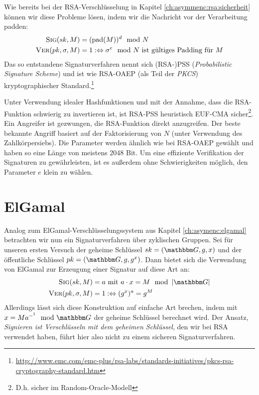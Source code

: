 Wie bereits bei der RSA-Verschlüsselung in Kapitel \ref{ch:asymmenc:rsa:sicherheit} können wir diese Probleme lösen, indem wir die Nachricht vor der Verarbeitung padden:
\begin{align*}
\textsc{Sig}(sk,M) &= (\text{pad}(M))^d \mod N\\
\textsc{Ver}(pk,\sigma,M) &= 1 :\Leftrightarrow \sigma^e \mod N \text{ ist gültiges Padding für } M
\end{align*}
Das so entstandene Signaturverfahren nennt sich (RSA-)PSS (\emph{Probabilistic Signature Scheme}) und ist wie RSA-OAEP (als Teil der \emph{PKCS}) kryptographischer Standard.\footnote{\url{http://www.emc.com/emc-plus/rsa-labs/standards-initiatives/pkcs-rsa-cryptography-standard.htm}}

Unter Verwendung idealer Hashfunktionen und mit der Annahme, dass die
RSA-Funktion schwierig zu invertieren ist, ist RSA-PSS heuristisch
EUF-CMA sicher\footnote{D.h. sicher im Random-Oracle-Modell}. Ein Angreifer ist gezwungen, die RSA-Funktion direkt anzugreifen. Der beste bekannte Angriff basiert auf der Faktorisierung von $N$ (unter Verwendung des Zahlkörpersiebs). Die Parameter werden ähnlich wie bei RSA-OAEP gewählt und haben so eine Länge von meistens 2048 Bit. Um eine effiziente Verifikation der Signaturen zu gewährleisten, ist es außerdem ohne Schwierigkeiten möglich, den Parameter $e$ klein zu wählen.


\section{ElGamal}
Analog zum ElGamal-Verschlüsselungssystem aus Kapitel \ref{ch:asymenc:elgamal} betrachten wir nun ein Signaturverfahren über zyklischen Gruppen.
Sei für unseren ersten Versuch der geheime Schlüssel $\skey = (\G, g,
x)$ und der öffentliche Schlüssel $\pkey = (\G, g, g^x)$. Dann bietet
sich die Verwendung von ElGamal zur Erzeugung einer Signatur auf diese
Art an: 
\begin{align*}
\sig(\skey,M) &= a \text{ mit } a \cdot x = M \mod \left|\G\right|\\
\ver(\pkey,\sigma,M) &= 1 :\Leftrightarrow (g^x)^a = g^M
\end{align*}
Allerdings lässt sich diese Konstruktion auf einfache Art brechen, indem
mit $x = M a^{-^1} \mod \G$ der geheime Schlüssel berechnet wird. 
Der Ansatz, \textit{\glqq Signieren ist Verschlüsseln mit dem geheimen
  Schlüssel\grqq}, den wir bei RSA verwendet haben, führt hier also
nicht zu einem sicheren Signaturverfahren.

